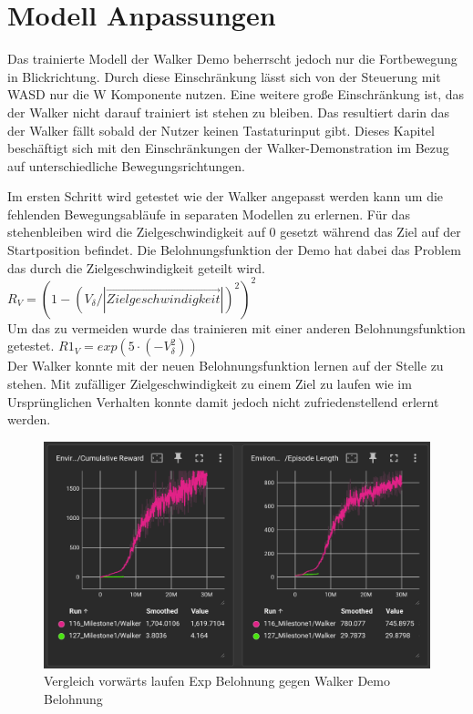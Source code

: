 \section{Modell Anpassungen}
Das trainierte Modell der Walker Demo beherrscht jedoch nur die Fortbewegung in Blickrichtung. Durch diese Einschränkung lässt sich von der Steuerung mit WASD nur die W Komponente nutzen. Eine weitere große Einschränkung ist, das der Walker nicht darauf trainiert ist stehen zu bleiben. Das resultiert darin das der Walker fällt sobald der Nutzer keinen Tastaturinput gibt. Dieses Kapitel beschäftigt sich mit den Einschränkungen der Walker-Demonstration im Bezug auf unterschiedliche Bewegungsrichtungen.

Im ersten Schritt wird getestet wie der Walker angepasst werden kann um die fehlenden Bewegungsabläufe in separaten Modellen zu erlernen.
Für das stehenbleiben wird die Zielgeschwindigkeit auf 0 gesetzt während das Ziel auf der Startposition befindet. Die Belohnungsfunktion der Demo hat dabei das Problem das durch die Zielgeschwindigkeit geteilt wird.\\
$R_V=(1 - (V_\delta / |\vec{Zielgeschwindigkeit}|)^2)^2$ \\
Um das zu vermeiden wurde das trainieren mit einer anderen Belohnungsfunktion getestet.
$R1_V=exp(5 \cdot (-V_\delta^2))$ \\
Der Walker konnte mit der neuen Belohnungsfunktion lernen auf der Stelle zu stehen. Mit zufälliger Zielgeschwindigkeit zu einem Ziel zu laufen wie im Ursprünglichen Verhalten konnte damit jedoch nicht zufriedenstellend erlernt werden.

\begin{figure}[H]
  \centering  
  \includegraphics[scale=0.5]{img/training_exp_belohnung.png}
  \caption{Vergleich vorwärts laufen Exp Belohnung gegen Walker Demo Belohnung}
  \label{fig:training_exp_belohnung}
\end{figure}


